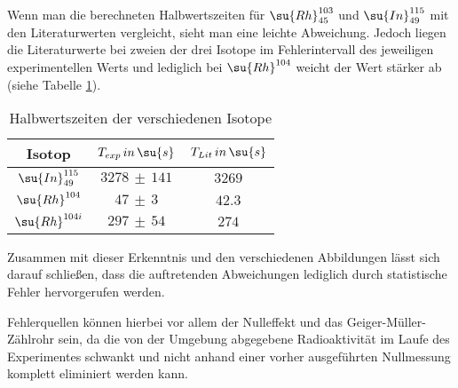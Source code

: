 Wenn man die berechneten Halbwertszeiten für $\su{Rh}_{45}^{103}$ und $\su{In}_{49}^{115}$
mit den Literaturwerten vergleicht, sieht man eine leichte Abweichung. Jedoch liegen
die Literaturwerte bei zweien der drei Isotope im Fehlerintervall des jeweiligen
experimentellen Werts und lediglich bei $\su{Rh}^{104}$ weicht der Wert stärker
ab (siehe Tabelle \ref{tab:vergleich}).

\begin{table}
  \centering
  \caption{Halbwertszeiten der verschiedenen Isotope}
  \label{tab:vergleich}
  \begin{tabular}{c c c}
    \toprule
    Isotop & $T_{exp} \, in \, \su{s}$ & $T_{Lit} \, in \, \su{s}$ \\
    \midrule
    $\su{In}_{49}^{115}$ & $3278 \, \pm \, 141$ & $3269$ \\
    $\su{Rh}^{104}$      & $47 \, \pm \, 3$     & $42.3$ \\
    $\su{Rh}^{104i}$     & $297 \, \pm \, 54$   & $274$  \\
    \bottomrule
  \end{tabular}
\end{table}

Zusammen mit dieser Erkenntnis und den verschiedenen Abbildungen lässt sich darauf
schließen, dass die auftretenden Abweichungen lediglich durch statistische Fehler
hervorgerufen werden.

Fehlerquellen können hierbei vor allem der Nulleffekt und das Geiger-Müller-Zählrohr
sein, da die von der Umgebung abgegebene Radioaktivität im Laufe des Experimentes
schwankt und nicht anhand einer vorher ausgeführten Nullmessung komplett
eliminiert werden kann.



